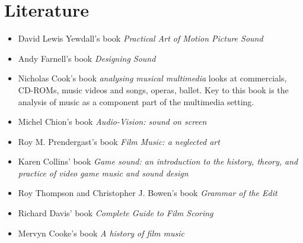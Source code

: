 
\chapter{Literature}
\label{literatures}

\begin{itemize}
\item David Lewis Yewdall's book \textit{Practical Art of Motion Picture Sound} \citep{yewdall2003practical} 

\item Andy Farnell's book \textit{Designing Sound} \citep{farnell2010designing}

 
\item Nicholas Cook's book \textit{analysing musical multimedia} \citep{cook1998analysing} looks at commercials, CD-ROMs, music videos and songs, operas, ballet. Key to this book is the analysis of music as a component part of the multimedia setting. 


\item Michel Chion's book \textit{Audio-Vision: sound on screen} \citep{chion1990} 


\item Roy M. Prendergast's book \textit{Film Music: a neglected art} \citep{prendergast1992film} 

\item Karen Collins' book \textit{Game sound: an introduction to the history, theory, and practice of video game music and sound design} \citep{collins2008game}


\item Roy Thompson and Christopher J. Bowen's book \textit{Grammar of the Edit} \citep{thompson2009grammar} 

\item Richard Davis' book \textit{Complete Guide to Film Scoring} \citep{davis2010complete}

\item Mervyn Cooke's book \textit{A history of film music} \citep{cooke2008history}

\end{itemize}
